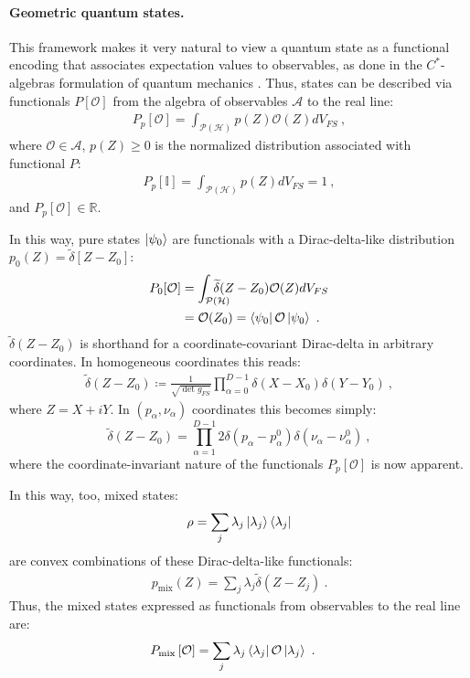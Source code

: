 \documentclass[draft,nofootinbib,prl,twocolumn,showpacs,showkeys,groupaddress,preprintnumbers,floatfix]{revtex4-1}
\newcommand{\1}{\mathbbm{1}}
\newcommand{\intP}{\int_{\mathcal{P}(\mathcal{H})} \!\!\!\!\!\!\!\!\!}
\begin{document}
\paragraph*{Geometric quantum states.}
This framework makes it very natural to view a quantum state as a functional
encoding that associates expectation values to observables, as done in the
$C^{*}$-algebras formulation of quantum mechanics \cite{Strocchi2008a}. Thus,
states can be described via functionals $P[\mathcal{O}]$ from the algebra of
observables $\mathcal{A}$ to the real line: 
\begin{align*}
P_p[\mathcal{O}]
  = \int_{\mathcal{P}(\mathcal{H})} p(Z) \mathcal{O}(Z) dV_{FS}
  ~,
\end{align*}
where $\mathcal{O} \in \mathcal{A}$, $p(Z) \geq 0$ is the
normalized distribution associated with functional $P$:
\begin{align*}
P_p[\mathbb{I}] = \int_{\mathcal{P}(\mathcal{H})}
  p(Z) dV_{FS}  = 1
  ~,
\end{align*}
and $P_p[\mathcal{O}] \in \mathbb{R}$.

In this way, pure states $\ket{\psi_0}$ are functionals with a Dirac-delta-like
distribution $p_0(Z) = \widetilde{\delta}\left[ Z - Z_0\right]$:
\begin{align*}
P_{0}[\mathcal{O}] &= \intP \widetilde{\delta}(Z-Z_0)\mathcal{O}(Z) dV_{FS} \\
  & = \mathcal{O}(Z_0)  = \bra{\psi_0}\mathcal{O}\ket{\psi_0}
  ~.
\end{align*}
$\widetilde{\delta}(Z-Z_0)$ is shorthand for a coordinate-covariant Dirac-delta in
arbitrary coordinates. In homogeneous coordinates this reads:
\begin{align*}
\widetilde{\delta}(Z - Z_0) \coloneqq \frac{1}{\sqrt{\det g_{FS}}}
  \prod_{\alpha=0}^{D-1} \delta(X - X_0) \delta(Y - Y_0)
  ~,
\end{align*}
where $Z = X + iY$. In $(p_\alpha,\nu_\alpha)$ coordinates this becomes simply:
\begin{equation}
\widetilde{\delta}(Z - Z_0) = \prod_{\alpha=1}^{D-1} 2\delta(p_\alpha - p_\alpha^0) \delta(\nu_\alpha - \nu_\alpha^0)
  ~,
\end{equation}
where the coordinate-invariant nature of the functionals $P_p[\mathcal{O}]$ is
now apparent.

In this way, too, mixed states:
\begin{align*}
\rho = \sum_{j}\lambda_j \ket{\lambda_j}\bra{\lambda_j}
\end{align*}
are convex combinations of these Dirac-delta-like functionals:
\begin{align*}
p_{\mathrm{mix}}(Z) = \sum_{j}\lambda_j \widetilde{\delta}(Z-Z_j)
  ~. 
\end{align*}
Thus, the mixed states expressed as functionals from observables to the real
line are:
\begin{align}
P_{\mathrm{mix}}\left[ \mathcal{O}\right]
  & = \sum_{j} \lambda_j \bra{\lambda_j}\mathcal{O}\ket{\lambda_j}
  ~.
\label{eq:Functional}
\end{align}
\end{document}
